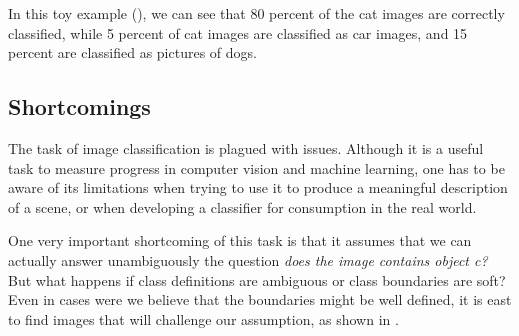 In this toy example (\tab{\ref{table:confusion_matrix}}), we can see that 80 percent of the cat images are correctly classified, while 5 percent of cat images are classified as car images, and 15 percent are classified as pictures of dogs.






\subsection{Shortcomings}

The task of image classification is plagued with issues. Although it is a useful task to measure progress in computer vision and machine learning, one has to be aware of its limitations when trying to use it to produce a meaningful description of a scene, or when developing a classifier for consumption in the real world.

One very important shortcoming of this task is that it assumes that we can actually answer unambiguously the question {\em does the image contains object c?} But what happens if class definitions are ambiguous or class boundaries are soft? Even in cases were we believe that the boundaries might be well defined, it is east to find images that will challenge our assumption, as shown in \fig{\ref{fig:whatisacar}}.

